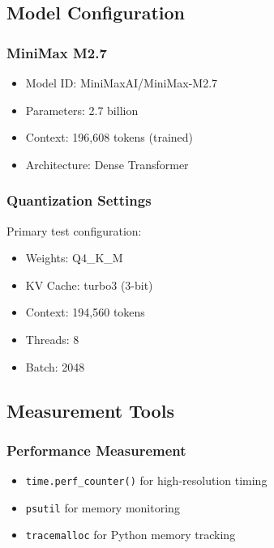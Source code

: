 \subsection{Model Configuration}

\subsubsection{MiniMax M2.7}

\begin{itemize}
    \item Model ID: MiniMaxAI/MiniMax-M2.7
    \item Parameters: 2.7 billion
    \item Context: 196,608 tokens (trained)
    \item Architecture: Dense Transformer
\end{itemize}

\subsubsection{Quantization Settings}

Primary test configuration:

\begin{itemize}
    \item Weights: Q4\_K\_M
    \item KV Cache: turbo3 (3-bit)
    \item Context: 194,560 tokens
    \item Threads: 8
    \item Batch: 2048
\end{itemize}

\subsection{Measurement Tools}

\subsubsection{Performance Measurement}

\begin{itemize}
    \item \texttt{time.perf\_counter()} for high-resolution timing
    \item \texttt{psutil} for memory monitoring
    \item \texttt{tracemalloc} for Python memory tracking
\end{itemize}

